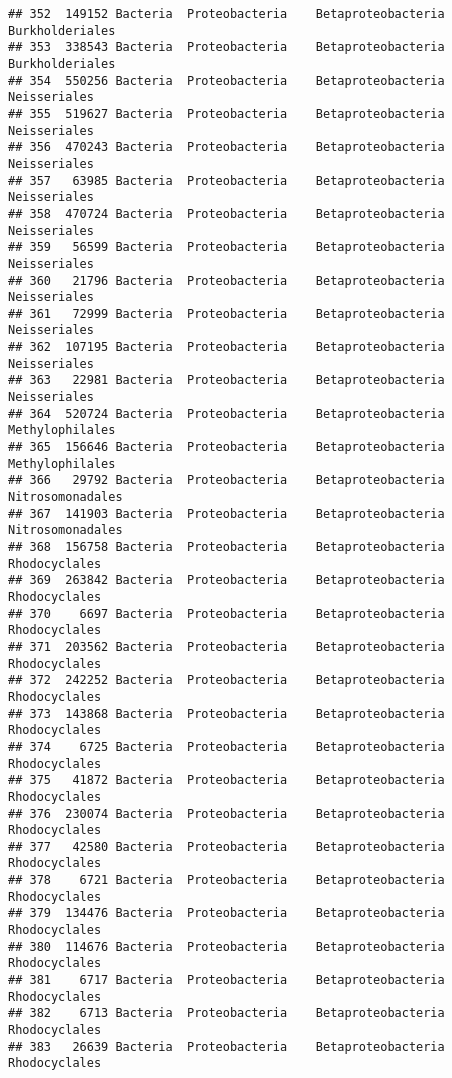 \documentclass[
]{article}
\begin{document}
\begin{verbatim}
## 352  149152 Bacteria  Proteobacteria    Betaproteobacteria     Burkholderiales
## 353  338543 Bacteria  Proteobacteria    Betaproteobacteria     Burkholderiales
## 354  550256 Bacteria  Proteobacteria    Betaproteobacteria        Neisseriales
## 355  519627 Bacteria  Proteobacteria    Betaproteobacteria        Neisseriales
## 356  470243 Bacteria  Proteobacteria    Betaproteobacteria        Neisseriales
## 357   63985 Bacteria  Proteobacteria    Betaproteobacteria        Neisseriales
## 358  470724 Bacteria  Proteobacteria    Betaproteobacteria        Neisseriales
## 359   56599 Bacteria  Proteobacteria    Betaproteobacteria        Neisseriales
## 360   21796 Bacteria  Proteobacteria    Betaproteobacteria        Neisseriales
## 361   72999 Bacteria  Proteobacteria    Betaproteobacteria        Neisseriales
## 362  107195 Bacteria  Proteobacteria    Betaproteobacteria        Neisseriales
## 363   22981 Bacteria  Proteobacteria    Betaproteobacteria        Neisseriales
## 364  520724 Bacteria  Proteobacteria    Betaproteobacteria     Methylophilales
## 365  156646 Bacteria  Proteobacteria    Betaproteobacteria     Methylophilales
## 366   29792 Bacteria  Proteobacteria    Betaproteobacteria    Nitrosomonadales
## 367  141903 Bacteria  Proteobacteria    Betaproteobacteria    Nitrosomonadales
## 368  156758 Bacteria  Proteobacteria    Betaproteobacteria       Rhodocyclales
## 369  263842 Bacteria  Proteobacteria    Betaproteobacteria       Rhodocyclales
## 370    6697 Bacteria  Proteobacteria    Betaproteobacteria       Rhodocyclales
## 371  203562 Bacteria  Proteobacteria    Betaproteobacteria       Rhodocyclales
## 372  242252 Bacteria  Proteobacteria    Betaproteobacteria       Rhodocyclales
## 373  143868 Bacteria  Proteobacteria    Betaproteobacteria       Rhodocyclales
## 374    6725 Bacteria  Proteobacteria    Betaproteobacteria       Rhodocyclales
## 375   41872 Bacteria  Proteobacteria    Betaproteobacteria       Rhodocyclales
## 376  230074 Bacteria  Proteobacteria    Betaproteobacteria       Rhodocyclales
## 377   42580 Bacteria  Proteobacteria    Betaproteobacteria       Rhodocyclales
## 378    6721 Bacteria  Proteobacteria    Betaproteobacteria       Rhodocyclales
## 379  134476 Bacteria  Proteobacteria    Betaproteobacteria       Rhodocyclales
## 380  114676 Bacteria  Proteobacteria    Betaproteobacteria       Rhodocyclales
## 381    6717 Bacteria  Proteobacteria    Betaproteobacteria       Rhodocyclales
## 382    6713 Bacteria  Proteobacteria    Betaproteobacteria       Rhodocyclales
## 383   26639 Bacteria  Proteobacteria    Betaproteobacteria       Rhodocyclales

\end{verbatim}
\end{document}
